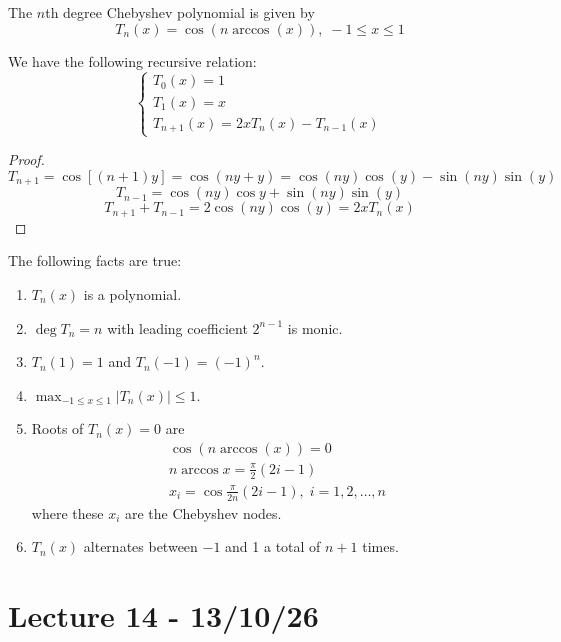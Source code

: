 \documentclass[11pt]{article}
\begin{document}
\begin{definition}
    The $n$th degree Chebyshev polynomial is given by
    \[
        T_n(x) = \cos(n\arccos(x)), \; -1 \le x \le 1
    \]
\end{definition}
\begin{remark}
    We have the following recursive relation:
    \[
        \begin{cases}
                T_0(x) = 1 \\
                T_1(x) = x\\
                T_{n+1}(x) = 2xT_n(x)-T_{n-1}(x) 
        \end{cases}
    \]
\end{remark}
\begin{proof}
    \[
    T_{n+1}= \cos[(n+1)y] = \cos(ny+y) = \cos(ny)\cos(y)-\sin(ny)\sin(y)
    \]
    \[
        T_{n-1} = \cos(ny) \cos y + \sin(ny)\sin(y)
    \]
   \[
    T_{n+1}+T_{n-1} = 2\cos(ny)\cos(y) = 2xT_n(x)
   \]
\end{proof}
\begin{remark} The following facts are true:
    \begin{enumerate}
        \item $T_n(x)$ is a polynomial.
        \item $\deg T_n = n$ with leading coefficient $2^{n-1}$ is monic.
        \item $T_n(1) =1$ and $T_n(-1)=(-1)^n$.
        \item $\max_{-1 \le x \le 1} |T_n(x)| \le 1$.
        \item Roots of $T_n(x) = 0$ are 
            \begin{align*}
            &\cos(n\arccos(x))=0\\
            &n \arccos x = \frac{\pi}{2} (2i-1)\\
            &x_i = \cos \frac{\pi}{2n}(2i-1), \; i = 1,2,\dots, n
            \end{align*}
            where these $x_i$ are the Chebyshev nodes.
        \item $T_n(x)$ alternates between $-1$ and 1 a total of $n+1$ times.
    \end{enumerate}
    
\end{remark}

\section{Lecture 14 - 13/10/26}
\end{document}
